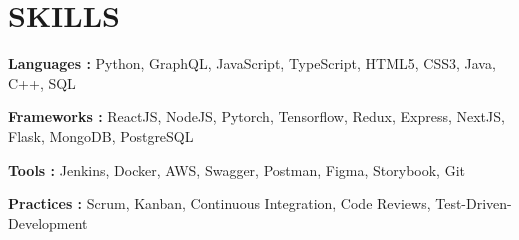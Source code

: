 \documentclass[letterpaper]{article}
\makeatletter
\newcommand{\resumeItemWithoutTitle}[1]{
  \item{
    {#1 \vspace{-4pt}}
  }
}
\newcommand{\shortSection}[1]{
    \vspace{-6pt}
    \section{#1}
}
\newcommand{\projectHeading}[4]{
  \begin{tabular*}{\textwidth}{l@{\extracolsep{\fill}}r}
        \textbf{#1} 
        \hspace{-2pt} $\vert$ \hspace{-2pt} {\textit{#2}} 
        \hspace{-2pt} $\vert$ \hspace{-2pt} \href{#3}{ \underline{Link}}
        &
        \textit{#4} \\
    \end{tabular*}\vspace{-2pt}
}
\newcommand{\projectHeadingWithoutLink}[3]{
  \begin{tabular*}{\textwidth}{l@{\extracolsep{\fill}}r}
        \textbf{#1} 
        \hspace{-2pt} $\vert$ \hspace{-2pt} {\textit{#2}}
        & 
        \textit{#3} \\
    \end{tabular*}\vspace{-2pt}
}
\newcommand*{\skill}[2]{
  \textbf{#1 : }#2 \\
  \vspace{1pt}
}
\newcommand{\resumeItemListStart}{\begin{itemize}}
\newcommand{\resumeItemListEnd}{\end{itemize}}
\makeatother
\begin{document}








\shortSection{SKILLS}
\skill {Languages\hspace{8pt}}{Python, GraphQL, JavaScript, TypeScript, HTML5, CSS3, Java, C++, SQL}
\skill {Frameworks}{ReactJS, NodeJS, Pytorch, Tensorflow, Redux, Express, NextJS, Flask, MongoDB,  PostgreSQL}
\skill {Tools\hspace{34pt}}{Jenkins, Docker, AWS, Swagger, Postman, Figma, Storybook, Git}
\skill {Practices \hspace{11pt}}{Scrum, Kanban, Continuous Integration, Code Reviews, Test-Driven-Development}
\end{document}
